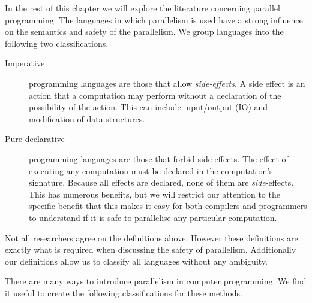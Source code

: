 
%


In the rest of this chapter we will explore the literature concerning
parallel programming.
The languages in which parallelism is used have a strong influence on the
semantics and safety of the parallelism.
We group languages into the following two classifications.

\begin{description}

    \item[Imperative] programming languages are those that allow
    \emph{side-effects}.
    A side effect is an action that a computation may perform
    without a declaration of the possibility of the action.
    This can include input/output (IO) and modification of data structures.

    \item[Pure declarative] programming languages are those that forbid
    side-effects.
    The effect of executing any computation must be declared in the
    computation's signature.
    Because all effects are declared, none of them are \emph{side}-effects.
    This has numerous benefits,
    but we will restrict our attention to the specific benefit
    that this makes it easy for both compilers and programmers to understand
    if it is safe to parallelise any particular computation.

\end{description}

\noindent
Not all researchers agree on the definitions above.
However these definitions are exactly what is required when discussing
the safety of parallelism.
Additionally our definitions allow us to classify all languages without any
ambiguity.

There are many ways to introduce parallelism in computer programming.
We find it useful to create the following classifications for these methods.

